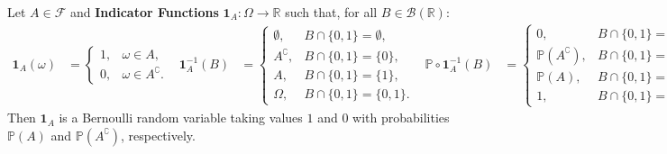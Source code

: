 \documentclass{huhtakm-template-book-v2}
\newcommand{\prob}{\mathbb{P}}
\begin{document}
    \begin{eg}
        Let $A \in \mathcal{F}$ and \textbf{Indicator Functions} $\mathbf{1}_{A}:\Omega \to \mathbb{R}$ such that, for all $B \in \mathcal{B}(\mathbb{R})$:
        \begin{align*}
            \mathbf{1}_{A}(\omega) &= \begin{cases}
                1, &\omega \in A,\\
                0, &\omega \in A^{\complement}.
            \end{cases} & \mathbf{1}_{A}^{-1}(B) &= \begin{cases}
                \emptyset, &B\cap\{0,1\} = \emptyset,\\
                A^{\complement}, & B\cap\{0,1\} = \{0\},\\
                A, &B\cap\{0,1\} = \{1\},\\
                \Omega, &B\cap\{0,1\} = \{0,1\}.
            \end{cases} & \prob \circ \mathbf{1}_{A}^{-1}(B) &= \begin{cases}
                0, &B\cap\{0,1\} = \emptyset,\\
                \prob(A^{\complement}), & B\cap\{0,1\} = \{0\},\\
                \prob(A), &B\cap\{0,1\} = \{1\},\\
                1, &B\cap\{0,1\} = \{0,1\}.
            \end{cases}
        \end{align*}
        Then $\mathbf{1}_{A}$ is a Bernoulli random variable taking values $1$ and $0$ with probabilities $\prob(A)$ and $\prob(A^{\complement})$, respectively.
    \end{eg}
\end{document}
